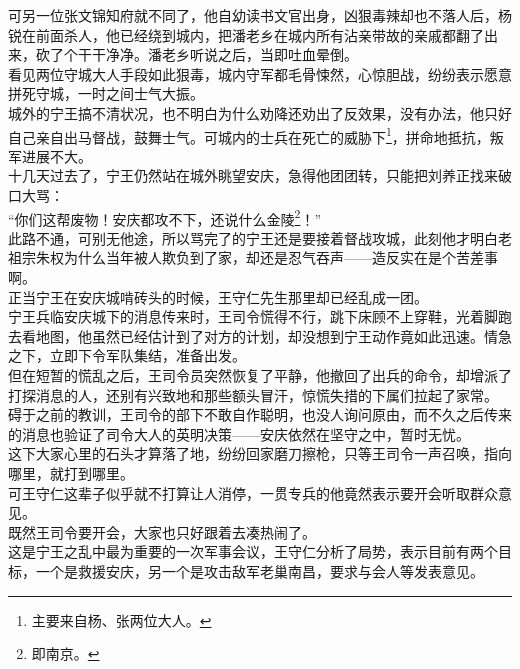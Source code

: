 \begin{multicols}{\theparacolNo}
可另一位张文锦知府就不同了，他自幼读书文官出身，凶狠毒辣却也不落人后，杨锐在前面杀人，他已经绕到城内，把潘老乡在城内所有沾亲带故的亲戚都翻了出来，砍了个干干净净。潘老乡听说之后，当即吐血晕倒。\\

看见两位守城大人手段如此狠毒，城内守军都毛骨悚然，心惊胆战，纷纷表示愿意拼死守城，一时之间士气大振。\\

城外的宁王搞不清状况，也不明白为什么劝降还劝出了反效果，没有办法，他只好自己亲自出马督战，鼓舞士气。可城内的士兵在死亡的威胁下\footnote{主要来自杨、张两位大人。}，拼命地抵抗，叛军进展不大。\\

十几天过去了，宁王仍然站在城外眺望安庆，急得他团团转，只能把刘养正找来破口大骂：\\

“你们这帮废物！安庆都攻不下，还说什么金陵\footnote{即南京。}！”\\

此路不通，可别无他途，所以骂完了的宁王还是要接着督战攻城，此刻他才明白老祖宗朱权为什么当年被人欺负到了家，却还是忍气吞声——造反实在是个苦差事啊。\\

正当宁王在安庆城啃砖头的时候，王守仁先生那里却已经乱成一团。\\

宁王兵临安庆城下的消息传来时，王司令慌得不行，跳下床顾不上穿鞋，光着脚跑去看地图，他虽然已经估计到了对方的计划，却没想到宁王动作竟如此迅速。情急之下，立即下令军队集结，准备出发。\\

但在短暂的慌乱之后，王司令员突然恢复了平静，他撤回了出兵的命令，却增派了打探消息的人，还别有兴致地和那些额头冒汗，惊慌失措的下属们拉起了家常。\\

碍于之前的教训，王司令的部下不敢自作聪明，也没人询问原由，而不久之后传来的消息也验证了司令大人的英明决策——安庆依然在坚守之中，暂时无忧。\\

这下大家心里的石头才算落了地，纷纷回家磨刀擦枪，只等王司令一声召唤，指向哪里，就打到哪里。\\

可王守仁这辈子似乎就不打算让人消停，一贯专兵的他竟然表示要开会听取群众意见。\\

既然王司令要开会，大家也只好跟着去凑热闹了。\\

这是宁王之乱中最为重要的一次军事会议，王守仁分析了局势，表示目前有两个目标，一个是救援安庆，另一个是攻击敌军老巢南昌，要求与会人等发表意见。\\


\end{multicols}

